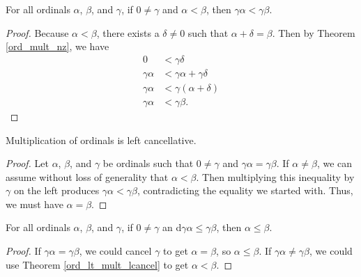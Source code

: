 \documentclass[../../math.tex]{subfiles}
\begin{document}
\begin{theorem} \label{ord_lt_lmult}
    For all ordinals $\alpha$, $\beta$, and $\gamma$, if $0 \neq \gamma$ and
    $\alpha < \beta$, then $\gamma\alpha < \gamma\beta$.
\end{theorem}
\begin{proof}
    Because $\alpha < \beta$, there exists a $\delta \neq 0$ such that $\alpha +
    \delta = \beta$.  Then by Theorem \ref{ord_mult_nz}, we have
    \begin{align*}
        0 &< \gamma\delta \\
        \gamma\alpha &< \gamma\alpha + \gamma\delta \\
        \gamma\alpha &< \gamma(\alpha + \delta) \\
        \gamma\alpha &< \gamma\beta.
    \end{align*}
\end{proof}

\begin{instance}
    Multiplication of ordinals is left cancellative.
\end{instance}
\begin{proof}
    Let $\alpha$, $\beta$, and $\gamma$ be ordinals such that $0 \neq \gamma$
    and $\gamma \alpha = \gamma \beta$.  If $\alpha \neq \beta$, we can assume
    without loss of generality that $\alpha < \beta$.  Then multiplying this
    inequality by $\gamma$ on the left produces $\gamma \alpha < \gamma \beta$,
    contradicting the equality we started with.  Thus, we must have $\alpha =
    \beta$.
\end{proof}

\begin{theorem} \label{ord_le_mult_lcancel}
    For all ordinals $\alpha$, $\beta$, and $\gamma$, if $0 \neq \gamma$ an
    d$\gamma \alpha \leq \gamma \beta$, then $\alpha \leq \beta$.
\end{theorem}
\begin{proof}
    If $\gamma\alpha = \gamma\beta$, we could cancel $\gamma$ to get $\alpha =
    \beta$, so $\alpha \leq \beta$.  If $\gamma\alpha \neq \gamma\beta$, we
    could use Theorem \ref{ord_lt_mult_lcancel} to get $\alpha < \beta$.
\end{proof}
\end{document}
